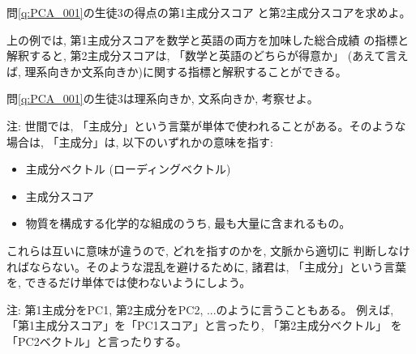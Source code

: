\begin{q}\label{q:PCA_006} 問\ref{q:PCA_001}の生徒3の得点の第1主成分スコア
と第2主成分スコアを求めよ。\end{q}

上の例では, 第1主成分スコアを数学と英語の両方を加味した総合成績
の指標と解釈すると, 第2主成分スコアは, 「数学と英語のどちらが得意か」
(あえて言えば, 理系向きか文系向きか)に関する指標と解釈することができる。

\begin{q}\label{q:PCA_008} 問\ref{q:PCA_001}の生徒3は理系向きか, 文系向きか, 考察せよ。\end{q}

{\small 注: 世間では, 「主成分」という言葉が単体で使われることがある。そのような
場合は, 「主成分」は, 以下のいずれかの意味を指す:
\begin{itemize}
\item 主成分ベクトル (ローディングベクトル)
\item 主成分スコア
\item 物質を構成する化学的な組成のうち, 最も大量に含まれるもの。
\end{itemize}
これらは互いに意味が違うので, どれを指すのかを, 文脈から適切に
判断しなければならない。そのような混乱を避けるために, 諸君は, 
「主成分」という言葉を, できるだけ単体では使わないようにしよう。\\}

{\small 注: 第1主成分をPC1, 第2主成分をPC2, ...のように言うこともある。
例えば, 「第1主成分スコア」を「PC1スコア」と言ったり, 「第2主成分ベクトル」
を「PC2ベクトル」と言ったりする。\\}


